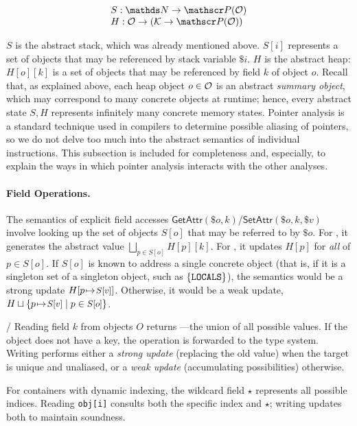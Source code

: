 \[
\begin{array}{@{}l@{}}
  S : \tN \to \powerset(\tO) \\
  H : \tO \to (\tK \to \powerset(\tO))
\end{array}
\]

$S$ is the abstract stack, which was already mentioned above.
$S[i]$ represents a set of objects that may be referenced
by stack variable $\$i$.
$H$ is the abstract heap: $H[o][k]$ is a set of objects that
may be referenced by field $k$ of object $o$.
Recall that, as explained above, each heap object $o\in\mathcal{O}$
is an abstract \emph{summary object}, which may correspond
to many concrete objects at runtime;
hence, every abstract state $S,H$ represents infinitely
many concrete memory states.
Pointer analysis is a standard technique used in compilers
to determine possible aliasing of pointers, so we do not
delve too much into the abstract semantics of individual
instructions.
This subsection is included for completeness and, especially,
to explain the ways in which pointer analysis interacts with
the other analyses.


\paragraph{Field Operations.}
The semantics of explicit field accesses 
$\mathsf{GetAttr}(\$o, k)$/$\mathsf{SetAttr}(\$o, k, \$v)$
involve looking up the set of objects $S[o]$ that may be
referred to by $\$o$.
For \tGetAttr, it generates the abstract value
$\bigsqcup_{p \in S[o]} H[p][k]$.
For \tSetAttr, it updates $H[p]$ for \emph{all} of $p\in S[o]$.
If $S[o]$ is known to address a single concrete object (that is, if it is a singleton set of a singleton object, such as
$\{\texttt{LOCALS}\}$),
the semantics would be a strong update
$H[p{\hspace{1pt}\mapsto\hspace{1pt}} \mbox{\small $S[v]$}]$.
Otherwise, it would be a weak update,
$H\sqcup\{p{\hspace{1pt}\mapsto\hspace{1pt}} \mbox{\small $S[v]$}\mid p\in \mbox{\small $S[o]$}\}$.

\tGetAttr/\tSetAttr
Reading field $k$ from objects $O$ returns ---the union of all possible values. If the object does not have a key, the operation is forwarded to the type system. Writing performs either a \emph{strong update} (replacing the old value) when the target is unique and unaliased, or a \emph{weak update} (accumulating possibilities) otherwise.

For containers with dynamic indexing, the wildcard field $\star$ represents all possible indices. Reading \texttt{obj[i]} consults both the specific index and $\star$; writing updates both to maintain soundness.

